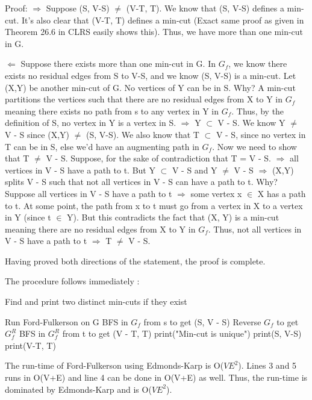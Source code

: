 \documentclass[11pt,a4paper]{article}
\begin{document}
	Proof: $\Longrightarrow$ Suppose (S, V-S) $\neq$ (V-T, T). We know that (S, V-S) defines a min-cut. It's also clear that (V-T, T) defines a min-cut (Exact same proof as given in Theorem 26.6 in CLRS easily shows this). Thus, we have more than one min-cut in G. 
	
	$\Longleftarrow$ Suppose there exists more than one min-cut in G. In $G_{f}$, we know there exists no residual edges from S to V-S, and we know (S, V-S) is a min-cut. Let (X,Y) be another min-cut of G. No vertices of Y can be in S. Why? A min-cut partitions the vertices such that there are no residual edges from X to Y in $G_{f}$ meaning there exists no path from s to any vertex in Y in $G_{f}$. Thus, by the definition of S, no vertex in Y is a vertex in S. $\Rightarrow$ Y $\subset$ V - S. We know Y $\neq$ V - S since (X,Y) $\neq$ (S, V-S). We also know that T $\subset$ V - S, since no vertex in T can be in S, else we'd have an augmenting path in $G_{f}$. Now we need to show that T $\neq$ V - S. Suppose, for the sake of contradiction that T = V - S. $\Rightarrow$ all vertices in V - S have a path to t. But Y $\subset$ V - S and Y $\neq$ V - S $\Rightarrow$ (X,Y) splits V - S such that not all vertices in V - S can have a path to t. Why? Suppose all vertices in V - S have a path to t $\Rightarrow$ some vertex x $\in$ X has a path to t. At some point, the path from x to t must go from a vertex in X to a vertex in Y (since t $\in$ Y). But this contradicts the fact that (X, Y) is a min-cut meaning there are no residual edges from X to Y in $G_{f}$. Thus, not all vertices in V - S have a path to t $\Rightarrow$ T $\neq$ V - S.
	
	Having proved both directions of the statement, the proof is complete.
	
	The procedure follows immediately : 
	\begin{algorithm}
	\caption{Find and print two distinct min-cuts if they exist}
	\begin{algorithmic}[1]
	\State Run Ford-Fulkerson on G
	\State BFS in $G_{f}$ from s to get (S, V - S)
	\State Reverse $G_{f}$ to get $G_{f}^{R}$
	\State BFS in $G_{f}^{R}$ from t to get (V - T, T)
		\State print("Min-cut is unique")
	\Else 
		\State print(S, V-S)
		\State print(V-T, T)
	\EndIf
	\EndFunction
	\end{algorithmic}
	\end{algorithm}
	
	The run-time of Ford-Fulkerson using Edmonds-Karp is O($VE^{2}$). Lines 3 and 5 runs in O(V+E) and line 4 can be done in O(V+E) as well. Thus, the run-time is dominated by Edmonds-Karp and is O($VE^{2}$).
	
\end{document}
